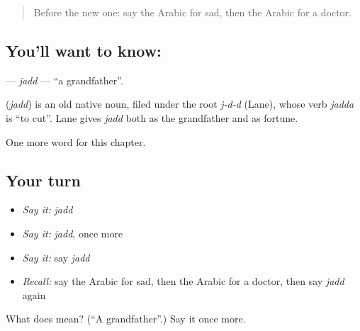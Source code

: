 \label{lesson:AR-C54-jadd}



\begin{quote}
Before the new one: say the Arabic for sad, then the Arabic for a doctor.
\end{quote}

\subsection*{You'll want to know: }
\textbf{} — \emph{jadd} — \textquotedblleft{}a grandfather\textquotedblright{}.

\begin{cousinweb}
\textbf{} (\emph{jadd}) is an old native noun, filed under the root \emph{j-d-d} (Lane), whose verb \emph{jadda} is \textquotedblleft{}to cut\textquotedblright{}. Lane gives \emph{jadd} both as the grandfather and as fortune.
\end{cousinweb}

\begin{grammarlens}[title={What you've built}]
One more word for this chapter.
\end{grammarlens}

\subsection*{Your turn}
\begin{itemize}
\raggedright
  \item \emph{Say it:} \emph{jadd}
  \item \emph{Say it:} \emph{jadd}, once more
  \item \emph{Say it:} say \emph{jadd}
  \item \emph{Recall:} say the Arabic for sad, then the Arabic for a doctor, then say \emph{jadd} again
\end{itemize}

\begin{tcolorbox}[breakable,colback=teal!4,colframe=teal!35!black,title={Before you move on}]
What does  mean? (\textquotedblleft{}A grandfather\textquotedblright{}.) Say it once more.
\end{tcolorbox}
